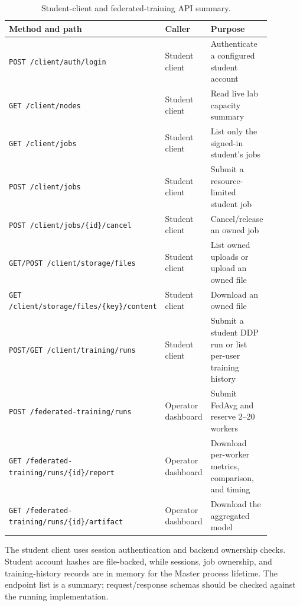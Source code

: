 \documentclass{article}
\begin{document}
\begin{table}[h!]
\centering
\caption{Student-client and federated-training API summary.}
\label{tab:api-client-training}
\begin{tabular}{|p{0.34\linewidth}|p{0.2\linewidth}|p{0.34\linewidth}|}
\hline
Method and path & Caller & Purpose \\
\hline
\texttt{POST /client/auth/login} & Student client & Authenticate a configured student account \\
\hline
\texttt{GET /client/nodes} & Student client & Read live lab capacity summary \\
\hline
\texttt{GET /client/jobs} & Student client & List only the signed-in student's jobs \\
\hline
\texttt{POST /client/jobs} & Student client & Submit a resource-limited student job \\
\hline
\texttt{POST /client/jobs/\{id\}/cancel} & Student client & Cancel/release an owned job \\
\hline
\texttt{GET/POST /client/storage/files} & Student client & List owned uploads or upload an owned file \\
\hline
\texttt{GET /client/storage/files/\{key\}/content} & Student client & Download an owned file \\
\hline
\texttt{POST/GET /client/training/runs} & Student client & Submit a student DDP run or list per-user training history \\
\hline
\texttt{POST /federated-training/runs} & Operator dashboard & Submit FedAvg and reserve 2--20 workers \\
\hline
\texttt{GET /federated-training/runs/\{id\}/report} & Operator dashboard & Download per-worker metrics, comparison, and timing \\
\hline
\texttt{GET /federated-training/runs/\{id\}/artifact} & Operator dashboard & Download the aggregated model \\
\hline
\end{tabular}
\end{table}

The student client uses session authentication and backend ownership checks. Student account hashes are file-backed, while sessions, job ownership, and training-history records are in memory for the Master process lifetime. The endpoint list is a summary; request/response schemas should be checked against the running implementation.
\end{document}
